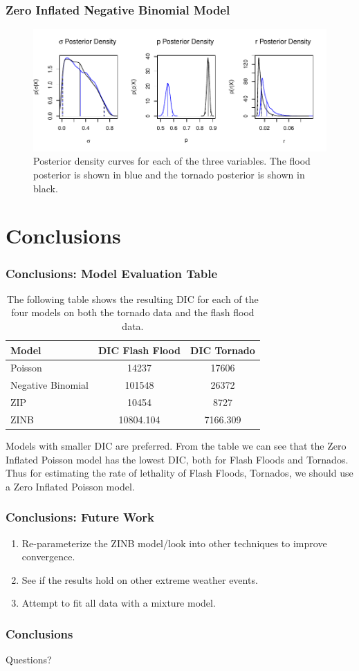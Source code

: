 \documentclass{beamer}
\begin{document}
	\begin{frame}
		\frametitle{Zero Inflated Negative Binomial Model}
		\begin{figure}[p]
			\centering
			\includegraphics[width=.9\textwidth]{figure/zinbdensity-1} 
			\caption{Posterior density curves for each of the three variables. The flood posterior is shown in blue and the tornado posterior is shown in black.}
		\end{figure} 
	\end{frame}
	
	\section{Conclusions}
	\begin{frame}
		\frametitle{Conclusions: Model Evaluation Table}
		\begin{table}
\centering
\caption{The following table shows the resulting DIC for each of the four models on both the tornado data and the flash flood data.}
\label{t:evalresults}
\begin{tabular}{lcc}
\toprule
Model & DIC Flash Flood & DIC Tornado\\
\midrule
Poisson & 14237 & 17606\\
Negative Binomial & 101548 & 26372\\
ZIP & 10454 & 8727 \\
ZINB & 10804.104&7166.309\\
\bottomrule
\end{tabular}
\end{table}

Models with smaller DIC are preferred. From the table we can see that the Zero Inflated Poisson model has the lowest DIC, both for Flash Floods and Tornados. Thus for estimating the rate of lethality of Flash Floods, Tornados, we should use a Zero Inflated Poisson model.
	\end{frame}
	\begin{frame}
	
		\frametitle{Conclusions: Future Work}
		\begin{enumerate}
			\item{Re-parameterize the ZINB model/look into other techniques to improve convergence.}
			\item{See if the results hold on other extreme weather events.}
			\item{Attempt to fit all data with a mixture model.}
		\end{enumerate}
	\end{frame}
	\begin{frame}
		\frametitle{Conclusions}
		Questions?
	\end{frame}
\end{document}
